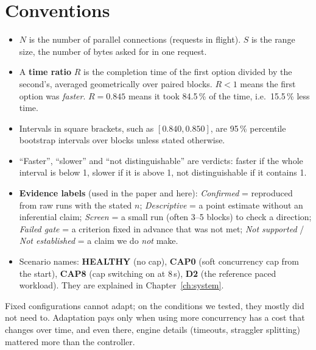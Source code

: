 \section*{Conventions}
\begin{itemize}
\item $N$ is the number of parallel connections (requests in flight). $S$ is the range size, the number of bytes asked for in one request.
\item A \textbf{time ratio} $R$ is the completion time of the first option divided by the second's, averaged geometrically over paired blocks. $R<1$ means the first option was \emph{faster}. $R = 0.845$ means it took 84.5\,\% of the time, i.e.\ 15.5\,\% less time.
\item Intervals in square brackets, such as $[0.840, 0.850]$, are 95\,\% percentile bootstrap intervals over blocks unless stated otherwise.
\item ``Faster'', ``slower'' and ``not distinguishable'' are verdicts: faster if the whole interval is below 1, slower if it is above 1, not distinguishable if it contains 1.
\item \textbf{Evidence labels} (used in the paper and here): \emph{Confirmed} = reproduced from raw runs with the stated $n$; \emph{Descriptive} = a point estimate without an inferential claim; \emph{Screen} = a small run (often 3--5 blocks) to check a direction; \emph{Failed gate} = a criterion fixed in advance that was not met; \emph{Not supported} / \emph{Not established} = a claim we do \emph{not} make.
\item Scenario names: \textbf{HEALTHY} (no cap), \textbf{CAP0} (soft concurrency cap from the start), \textbf{CAP8} (cap switching on at 8\,s), \textbf{D2} (the reference paced workload). They are explained in Chapter~\ref{ch:system}.
\end{itemize}

\begin{keyidea}
Fixed configurations cannot adapt; on the conditions we tested, they mostly did not need to. Adaptation pays only when using more concurrency has a cost that changes over time, and even there, engine details (timeouts, straggler splitting) mattered more than the controller.
\end{keyidea}

